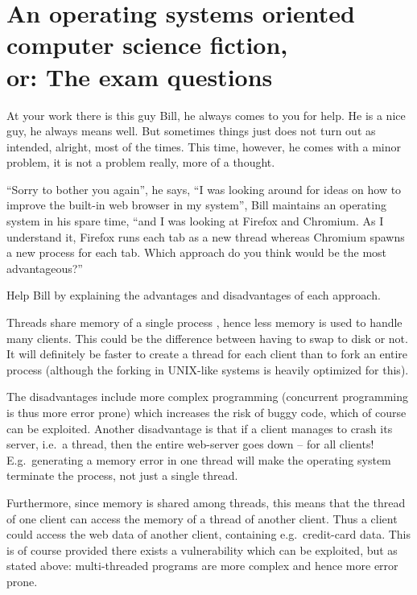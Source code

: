 \documentclass[addpoints]{miunexam}
\begin{document}
\clearpage
\section*{An operating systems oriented computer science fiction,\\
  or: The exam questions}
\noindent

\begin{questions}
  \question[4]\label{q:threads}
  At your work there is this guy Bill, he always comes to you for help.
  He is a nice guy, he always means well.
  But sometimes things just does not turn out as intended, alright, most of the 
  times.
  This time, however, he comes with a minor problem, it is not a problem 
  really, more of a thought.

  ``Sorry to bother you again'', he says, ``I was looking around for ideas on 
  how to improve the built-in web browser in my system'', Bill maintains an 
  operating system in his spare time, ``and I was looking at Firefox and 
  Chromium.
  As I understand it, Firefox runs each tab as a new thread whereas Chromium 
  spawns a new process for each tab.
  Which approach do you think would be the most advantageous?''

  Help Bill by explaining the advantages and disadvantages of each approach.
  \begin{solution}
    Threads share memory of a single process \cite[p.  
    153--154]{Silberschatz2009osc}, hence less memory is used to handle many 
    clients.
    This could be the difference between having to swap to disk or not.
    It will definitely be faster to create a thread for each client than to 
    fork an entire process \cite[p. 154]{Silberschatz2009osc} (although the 
    forking in UNIX-like systems is heavily optimized for this).

    The disadvantages include more complex programming (concurrent programming 
    is thus more error prone) which increases the risk of buggy code, which of 
    course can be exploited.
    Another disadvantage is that if a client manages to crash its server, i.e.\ 
    a thread, then the entire web-server goes down -- for all clients!
    E.g.\ generating a memory error in one thread will make the operating 
    system terminate the process, not just a single thread.

    Furthermore, since memory is shared among threads, this means that the 
    thread of one client can access the memory of a thread of another client.
    Thus a client could access the web data of another client, containing e.g.\ 
    credit-card data.
    This is of course provided there exists a vulnerability which can be 
    exploited, but as stated above: multi-threaded programs are more complex 
    and hence more error prone.
  \end{solution}


\end{questions}
\end{document}
